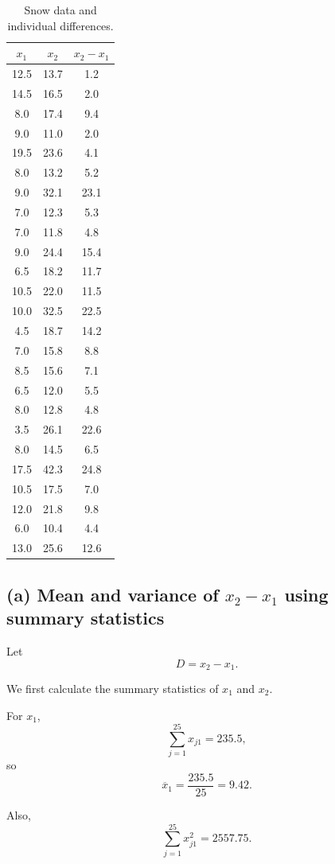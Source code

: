 \documentclass[12pt,a4paper]{article}
\begin{document}
\begin{table}[H]
\centering
\small
\begin{tabular}{ccc}
\toprule
$x_1$ & $x_2$ & $x_2-x_1$\\
\midrule
12.5 & 13.7 & 1.2\\
14.5 & 16.5 & 2.0\\
8.0 & 17.4 & 9.4\\
9.0 & 11.0 & 2.0\\
19.5 & 23.6 & 4.1\\
8.0 & 13.2 & 5.2\\
9.0 & 32.1 & 23.1\\
7.0 & 12.3 & 5.3\\
7.0 & 11.8 & 4.8\\
9.0 & 24.4 & 15.4\\
6.5 & 18.2 & 11.7\\
10.5 & 22.0 & 11.5\\
10.0 & 32.5 & 22.5\\
4.5 & 18.7 & 14.2\\
7.0 & 15.8 & 8.8\\
8.5 & 15.6 & 7.1\\
6.5 & 12.0 & 5.5\\
8.0 & 12.8 & 4.8\\
3.5 & 26.1 & 22.6\\
8.0 & 14.5 & 6.5\\
17.5 & 42.3 & 24.8\\
10.5 & 17.5 & 7.0\\
12.0 & 21.8 & 9.8\\
6.0 & 10.4 & 4.4\\
13.0 & 25.6 & 12.6\\
\bottomrule
\end{tabular}
\caption{Snow data and individual differences.}
\end{table}

\subsection*{(a) Mean and variance of \(x_2-x_1\) using summary statistics}

Let
\[
D=x_2-x_1.
\]

We first calculate the summary statistics of \(x_1\) and \(x_2\).

For \(x_1\),
\[
\sum_{j=1}^{25}x_{j1}=235.5,
\]
so
\[
\overline{x}_1
=
\frac{235.5}{25}
=
\boxed{9.42}.
\]

Also,
\[
\sum_{j=1}^{25}x_{j1}^2=2557.75.
\]
\end{document}
